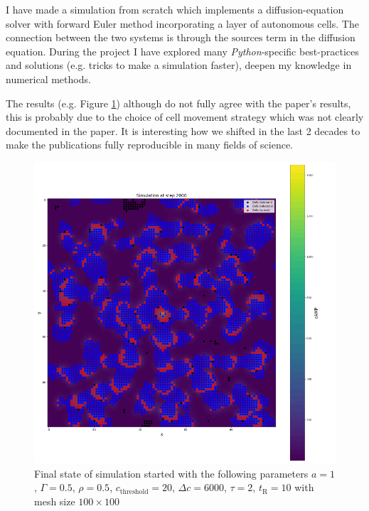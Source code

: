 \documentclass[a4paper,12pt]{article}
\begin{document}
I have made a simulation from scratch which implements a diffusion-equation solver with forward Euler method incorporating a layer of autonomous cells. The connection between the two systems is through the $\text{sources}$ term in the diffusion equation. During the project I have explored many \emph{Python}-specific best-practices and solutions (e.g. tricks to make a simulation faster), deepen my knowledge in numerical methods.

The results (e.g. Figure \ref{fig:pudgy}) although do not fully agree with the paper's \cite{kessler1993} results, this is probably due to the choice of cell movement strategy which was not clearly documented in the paper. It is interesting how we shifted in the last 2 decades to make the publications fully reproducible in many fields of science.

\begin{figure}
\centering
 \includegraphics[width=\textwidth]{pudgy.png}
 \caption{Final state of simulation started with the following parameters $a=1$, $\Gamma=0.5$, $\rho=0.5$, $c_\text{threshold}=20$, $\Delta c=6000$, $\tau=2$, $t_\text{R}=10$ with mesh size $100 \times 100$}
 \label{fig:pudgy}
\end{figure}
\end{document}
